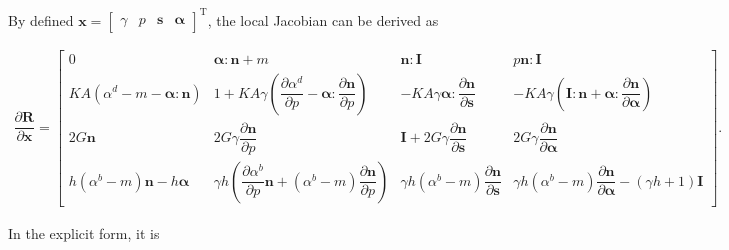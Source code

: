 \documentclass[11pt,fleqn]{article}
\newcommand*{\mT}{\mathrm{T}}
\newcommand*{\pfrac}[2]{\dfrac{\partial#1}{\partial#2}}
\begin{document}
By defined $\mathbold{x}=\begin{bmatrix}\gamma&p&\mathbold{s}&\mathbold{\alpha}\end{bmatrix}^\mT$, the local Jacobian can be derived as
\begin{footnotesize}
\begin{gather*}
\pfrac{\mathbold{R}}{\mathbold{x}}=
\begin{bmatrix}
	0                                                      & \mathbold{\alpha}:\mathbold{n}+m                                                      & \mathbold{n}:\mathbf{I}                                       & p\mathbold{n}:\mathbf{I}                                                                                \\[4mm]
	KA\left(\alpha^d-m-\mathbold{\alpha}:\mathbold{n}\right) & 1+KA\gamma\left(\pfrac{\alpha^d}{p}-\mathbold{\alpha}:\pfrac{\mathbold{n}}{p}\right)  & -KA\gamma\mathbold{\alpha}:\pfrac{\mathbold{n}}{\mathbold{s}} & -KA\gamma\left(\mathbf{I}:\mathbold{n}+\mathbold{\alpha}:\pfrac{\mathbold{n}}{\mathbold{\alpha}}\right) \\[4mm]
	2G\mathbold{n}                                         & 2G\gamma\pfrac{\mathbold{n}}{p}                                                       & \mathbf{I}+2G\gamma\pfrac{\mathbold{n}}{\mathbold{s}}         & 2G\gamma\pfrac{\mathbold{n}}{\mathbold{\alpha}}                                                         \\[4mm]
	h\left(\alpha^b-m\right)\mathbold{n}-h\mathbold{\alpha}               & \gamma{}h\left(\pfrac{\alpha^b}{p}\mathbold{n}+\left(\alpha^b-m\right)\pfrac{\mathbold{n}}{p}\right) & \gamma{}h\left(\alpha^b-m\right)\pfrac{\mathbold{n}}{\mathbold{s}}           & \gamma{}h\left(\alpha^b-m\right)\pfrac{\mathbold{n}}{\mathbold{\alpha}}-\left(\gamma{}h+1\right)\mathbf{I}
\end{bmatrix}.
\end{gather*}
\end{footnotesize}
In the explicit form, it is
\end{document}
